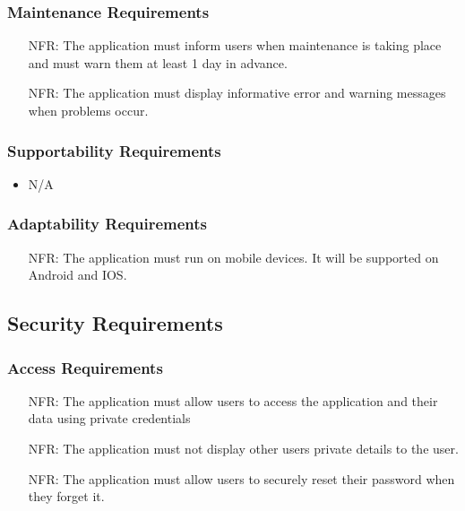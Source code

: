 \documentclass[12pt]{article}
\newcounter{nfrnum} %
\begin{document}
  \subsubsection{Maintenance Requirements}
    \noindent \begin{itemize}
      \item[NFR\refstepcounter{nfrnum}\thenfrnum:]
        The application must inform users when maintenance is taking place and must warn them at least 1 day in advance.
      \item[NFR\refstepcounter{nfrnum}\thenfrnum:]
        The application must display informative error and warning messages when problems occur.  
    \end{itemize}
  \subsubsection{Supportability Requirements}
    \noindent \begin{itemize}
      \item N/A
    \end{itemize}
  \subsubsection{Adaptability Requirements}
    \noindent \begin{itemize}
      \item[NFR\refstepcounter{nfrnum}\thenfrnum:]
        The application must run on mobile devices. It will be supported on Android and IOS.
    \end{itemize}

\subsection{Security Requirements}
  \subsubsection{Access Requirements}
    \noindent \begin{itemize}
      \item[NFR\refstepcounter{nfrnum}\thenfrnum:]
        The application must allow users to access the application and their data using private credentials
      \item[NFR\refstepcounter{nfrnum}\thenfrnum:]
        The application must not display other users private details to the user.
      \item[NFR\refstepcounter{nfrnum}\thenfrnum:]
        The application must allow users to securely reset their password when they forget it.
    \end{itemize}
\end{document}
